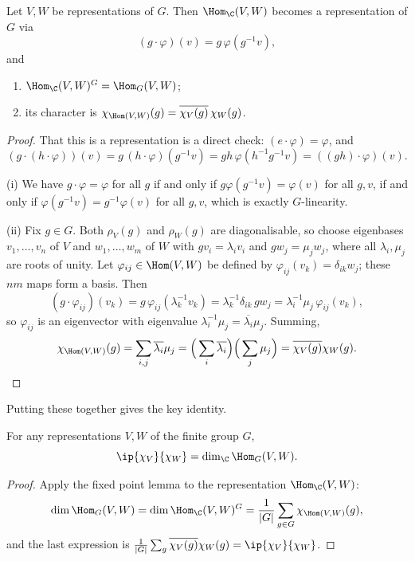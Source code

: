 \begin{lemma}
	Let $V, W$ be representations of $G$. Then $\Hom_\C(V,W)$ becomes a representation of $G$ via
	$$(g\cdot \varphi)(v) = g\,\varphi(g^{-1}v),$$
	and
	\begin{enumerate}[label=(\roman*)]
		\item $\Hom_\C(V,W)^G = \Hom_G(V,W)$;
		\item its character is $\chi_{\Hom(V,W)}(g) = \overline{\chi_V(g)}\,\chi_W(g)$.
	\end{enumerate}
\end{lemma}
\begin{proof}
	That this is a representation is a direct check: $(e\cdot\varphi) = \varphi$, and
	$$(g\cdot(h\cdot\varphi))(v) = g\,(h\cdot\varphi)(g^{-1}v) = gh\,\varphi(h^{-1}g^{-1}v) = ((gh)\cdot\varphi)(v).$$

	(i) We have $g\cdot\varphi = \varphi$ for all $g$ if and only if $g\varphi(g^{-1}v) = \varphi(v)$ for all $g, v$, if and only if $\varphi(g^{-1}v) = g^{-1}\varphi(v)$ for all $g,v$, which is exactly $G$-linearity.

	(ii) Fix $g \in G$. Both $\rho_V(g)$ and $\rho_W(g)$ are diagonalisable, so choose eigenbases $v_1, \dots, v_n$ of $V$ and $w_1, \dots, w_m$ of $W$ with $gv_i = \lambda_i v_i$ and $gw_j = \mu_j w_j$, where all $\lambda_i, \mu_j$ are roots of unity. Let $\varphi_{ij} \in \Hom(V,W)$ be defined by $\varphi_{ij}(v_k) = \delta_{ik}w_j$; these $nm$ maps form a basis. Then
	$$(g\cdot\varphi_{ij})(v_k) = g\,\varphi_{ij}(\lambda_k^{-1}v_k) = \lambda_k^{-1}\delta_{ik}\, gw_j = \lambda_i^{-1}\mu_j\,\varphi_{ij}(v_k),$$
	so $\varphi_{ij}$ is an eigenvector with eigenvalue $\lambda_i^{-1}\mu_j = \overline{\lambda_i}\mu_j$. Summing,
	$$\chi_{\Hom(V,W)}(g) = \sum_{i,j}\overline{\lambda_i}\mu_j = \Big(\sum_i \overline{\lambda_i}\Big)\Big(\sum_j \mu_j\Big) = \overline{\chi_V(g)}\chi_W(g). \qedhere$$
\end{proof}

Putting these together gives the key identity.

\begin{theorem}
	For any representations $V, W$ of the finite group $G$,
	$$\ip{\chi_V}{\chi_W} = \dim_\C \Hom_G(V,W).$$
\end{theorem}
\begin{proof}
	Apply the fixed point lemma to the representation $\Hom_\C(V,W)$:
	$$\dim \Hom_G(V,W) = \dim \Hom_\C(V,W)^G = \frac1{|G|}\sum_{g\in G}\chi_{\Hom(V,W)}(g),$$
	and the last expression is $\frac1{|G|}\sum_{g} \overline{\chi_V(g)}\chi_W(g) = \ip{\chi_V}{\chi_W}$.
\end{proof}

